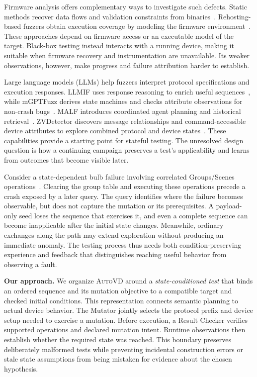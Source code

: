 \documentclass[10pt,journal,compsoc]{IEEEtran}
\newcommand{\system}{\textsc{AutoVD}}
\newcommand{\parab}[1]{\vspace{0.04in}\noindent\textbf{#1}}
\begin{document}
Firmware analysis offers complementary ways to investigate such defects. Static methods recover data flows and validation constraints from binaries~\cite{karonte,satc,mango,nuwa}. Rehosting-based fuzzers obtain execution coverage by modeling the firmware environment~\cite{firmafl,fuzzware,hoedur}. These approaches depend on firmware access or an executable model of the target. Black-box testing instead interacts with a running device, making it suitable when firmware recovery and instrumentation are unavailable. Its weaker observations, however, make progress and failure attribution harder to establish.

Large language models (LLMs) help fuzzers interpret protocol specifications and execution responses. LLMIF uses response reasoning to enrich useful sequences~\cite{llmif}, while mGPTFuzz derives state machines and checks attribute observations for non-crash bugs~\cite{mgptfuzz}. MALF introduces coordinated agent planning and historical retrieval~\cite{malf}. ZVDetector discovers message relationships and command-accessible device attributes to explore combined protocol and device states~\cite{zvdetector}. These capabilities provide a starting point for stateful testing. The unresolved design question is how a continuing campaign preserves a test's applicability and learns from outcomes that become visible later.

Consider a state-dependent bulb failure involving correlated Groups/Scenes operations~\cite{zvdetector}. Clearing the group table and executing these operations precede a crash exposed by a later query. The query identifies where the failure becomes observable, but does not capture the mutation or its prerequisites. A payload-only seed loses the sequence that exercises it, and even a complete sequence can become inapplicable after the initial state changes. Meanwhile, ordinary exchanges along the path may extend exploration without producing an immediate anomaly. The testing process thus needs both condition-preserving experience and feedback that distinguishes reaching useful behavior from observing a fault.

\parab{Our approach.}
We organize \system{} around a \emph{state-conditioned test} that binds an ordered sequence and its mutation objective to a compatible target and checked initial conditions. This representation connects semantic planning to actual device behavior. The Mutator jointly selects the protocol prefix and device setup needed to exercise a mutation. Before execution, a Result Checker verifies supported operations and declared mutation intent. Runtime observations then establish whether the required state was reached. This boundary preserves deliberately malformed tests while preventing incidental construction errors or stale state assumptions from being mistaken for evidence about the chosen hypothesis.
\end{document}
